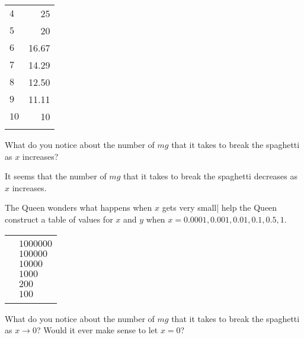 \begin{problem}
\begin{subproblem}
\begin{shortsolution}
\begin{tabular}[t]{ld{2}}
			$4$           & 25            \\\normalline
			$5$           & 20            \\\normalline
			$6$           & 16.67         \\\normalline
			$7$           & 14.29         \\\normalline
			$8$           & 12.50         \\\normalline
			$9$           & 11.11         \\\normalline
			$10$          & 10            \\\lastline
		\end{tabular}
	\end{shortsolution}
\end{subproblem}
\begin{subproblem}
	What do you notice about the number of $\unit{mg}$ that it takes to break
	the spaghetti as $x$ increases?
	\begin{shortsolution}
		It seems that the number of $\unit{mg}$ that it takes to break the spaghetti decreases
		as $x$ increases.
	\end{shortsolution}
\end{subproblem}
\begin{subproblem}\label{rat:prob:spaglt1}
	The Queen wonders what happens when $x$ gets very small| help the Queen construct
	a table of values for $x$ and $y$ when $x=0.0001, 0.001, 0.01, 0.1, 0.5, 1$.
	\begin{shortsolution}
		\begin{tabular}[t]{d{2}l}
			\beforeheading
			 &  \\
			        & $1000000$     \\         & $100000$      \\          & $10000$       \\           & $1000$        \\           & $200$         \\             & $100$         \\\lastline
		\end{tabular}
	\end{shortsolution}
\end{subproblem}
\begin{subproblem}
	What do you notice about the number of $\unit{mg}$ that it takes to break the spaghetti
	as $x\rightarrow 0$? Would it ever make sense to let $x=0$?

\end{subproblem}
\end{problem}
